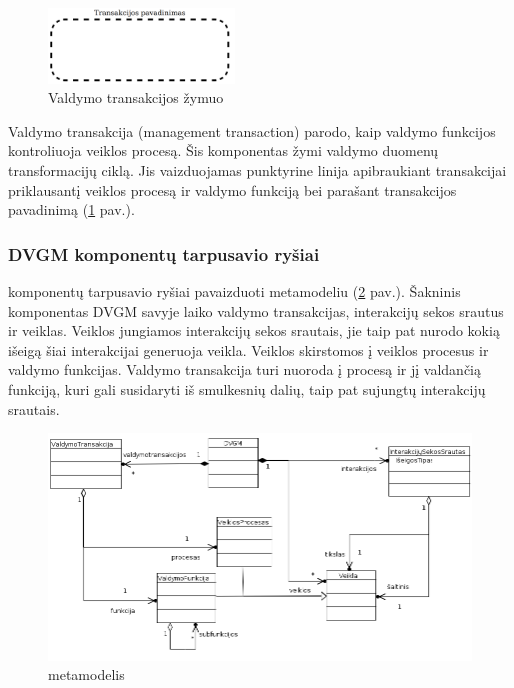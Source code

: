 \begin{figure}[H]
	\centering
	\includegraphics[height=2cm]{img/dvcm_components/management_transaction}
	\caption{Valdymo transakcijos žymuo}
	\label{img:dvcm_components_management_transaction}
\end{figure}

Valdymo transakcija (management transaction) parodo, kaip valdymo funkcijos kontroliuoja veiklos procesą. Šis komponentas žymi valdymo duomenų transformacijų ciklą. Jis vaizduojamas punktyrine linija apibraukiant transakcijai priklausantį veiklos procesą ir valdymo funkciją bei parašant transakcijos pavadinimą
(\ref{img:dvcm_components_management_transaction} pav.).

\subsubsection{DVGM komponentų tarpusavio ryšiai}

\DVCM{} komponentų tarpusavio ryšiai pavaizduoti metamodeliu (\ref{img:dvcm_metamodel} pav.). Šakninis komponentas DVGM savyje laiko valdymo transakcijas, interakcijų sekos srautus ir veiklas. Veiklos jungiamos interakcijų sekos srautais, jie taip pat nurodo kokią išeigą šiai interakcijai generuoja veikla. Veiklos skirstomos į veiklos procesus ir valdymo funkcijas. Valdymo transakcija turi nuoroda į procesą ir jį valdančią funkciją, kuri gali susidaryti iš smulkesnių dalių, taip pat sujungtų interakcijų srautais.

\begin{figure}[H]
	\centering
	\includegraphics[width=\textwidth]{sections/modeling_methods_and_languages/img/dvcm_metamodel}
	\caption{\DVCM{} metamodelis}
	\label{img:dvcm_metamodel}
\end{figure}



